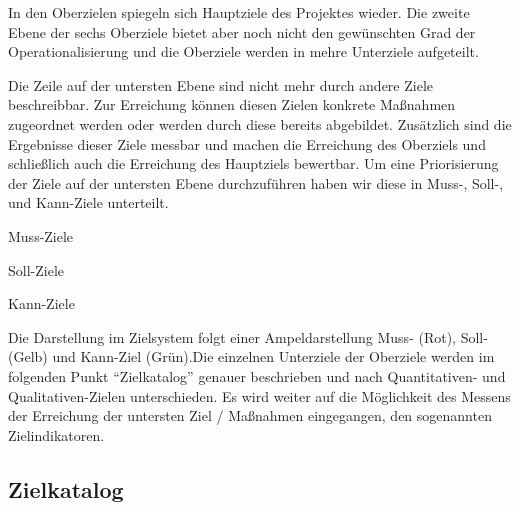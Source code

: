 In den Oberzielen spiegeln sich Hauptziele des Projektes wieder. Die zweite
Ebene der sechs Oberziele bietet aber noch nicht den gewünschten Grad der
Operationalisierung und die Oberziele werden in mehre Unterziele aufgeteilt.

Die Zeile auf der untersten Ebene sind nicht mehr durch andere Ziele
beschreibbar. Zur Erreichung können diesen Zielen konkrete Maßnahmen zugeordnet
werden oder werden durch diese bereits abgebildet. Zusätzlich sind die
Ergebnisse dieser Ziele messbar und machen die Erreichung des Oberziels und
schließlich auch die Erreichung des Hauptziels bewertbar.
Um eine Priorisierung der Ziele auf der untersten Ebene durchzuführen haben wir
diese in Muss-, Soll-, und Kann-Ziele unterteilt.

Muss-Ziele

Soll-Ziele

Kann-Ziele

Die Darstellung im Zielsystem folgt einer Ampeldarstellung Muss- (Rot), Soll-
(Gelb) und Kann-Ziel (Grün).Die einzelnen Unterziele der Oberziele werden im
folgenden Punkt "`Zielkatalog"' genauer beschrieben und nach Quantitativen- und
Qualitativen-Zielen unterschieden. Es wird weiter auf die Möglichkeit des
Messens der Erreichung der untersten Ziel / Maßnahmen eingegangen, den
sogenannten Zielindikatoren.

\subsection{Zielkatalog}
\label{sec:Zielkatalog}
